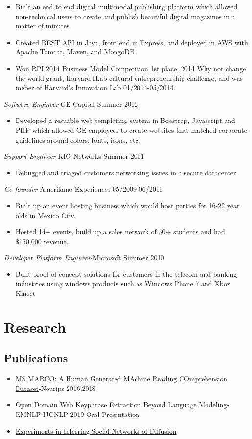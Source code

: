 \documentclass[line,margin]{res}
\begin{document}
\begin{resume}
\begin{itemize}  \itemsep -4pt
\item Built an end to end digital multimodal publishing platform which allowed non-technical users to create and publish beautiful digital magazines in a matter of minutes.
\item Created REST API in Java, front end in Express, and deployed in AWS with Apache Tomcat, Maven, and MongoDB.
\item Won RPI 2014 Business Model Competition 1st place, 2014 Why not change the world grant, Harvard ILab cultural entrepreneurship challenge, and was meber of Harvard's Innovation Lab 01/2014-05/2014.
\end{itemize}
{\sl Software Engineer}-GE Capital \hfill Summer 2012
\begin{itemize}  \itemsep -4pt
\item Developed a resuable web templating system in Boostrap, Javascript and PHP which allowed GE employees to create websites that matched corporate guidelines around colors, fonts, icons, etc.
\end{itemize}
{\sl Support Engineer}-KIO Networks \hfill Summer 2011
\begin{itemize}  \itemsep -4pt
\item Debugged and triaged customers networking issues in a secure datacenter.
\end{itemize}
{\sl Co-founder}-Amerikano Experiences \hfill 05/2009-06/2011
\begin{itemize}  \itemsep -4pt
\item Built up an event hosting business which would host parties for 16-22 year olds in Mexico City.
\item Hosted 14+ events, build up a sales network of 50+ students and had \$150,000 revenue.
\end{itemize}
{\sl Developer Platform Engineer}-Microsoft \hfill Summer 2010
\begin{itemize}  \itemsep -4pt
\item Built proof of concept solutions for customers in the telecom and banking industries using windows products such as Windows Phone 7 and Xbox Kinect
\end{itemize}
\section{Research}
\subsection{Publications}
\begin{itemize}
\itemsep -5pt
\item \href{https://arxiv.org/pdf/1611.09268.pdf}{MS MARCO: A Human Generated MAchine Reading COmprehension Dataset}-Neurips 2016,2018
\item \href{https://www.emnlp-ijcnlp2019.org/program/accepted/f}{Open Domain Web Keyphrase Extraction Beyond Language Modeling}-EMNLP-IJCNLP 2019 Oral Presentation
\item \href{https://arxiv.org/pdf/}{Experiments in Inferring Social Networks of Diffusion}
\end{itemize}

\end{resume}
\end{document}
